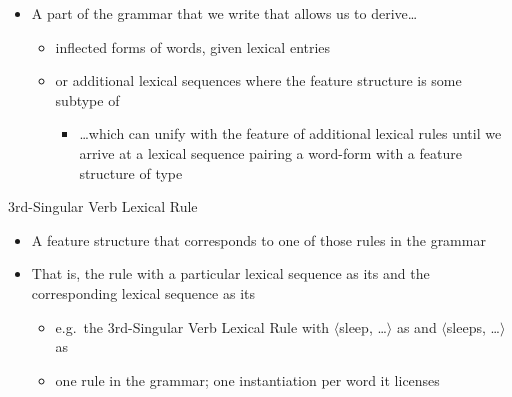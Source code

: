 \documentclass[a4paper,landscape,headrule,footrule]{foils}
\begin{document}

\begin{itemize}
\item A part of the grammar that we write that allows us to derive\ldots
  \begin{itemize}
  \item inflected forms of words, given lexical entries
  \item or additional lexical sequences where the feature structure is
    some subtype of 
    \begin{itemize}
    \item \ldots which can unify with the  feature of
      additional lexical rules until we arrive at a lexical sequence
      pairing a word-form with a feature structure of type 
    \end{itemize}
  \end{itemize}
\end{itemize}

\begin{center}
3rd-Singular Verb Lexical Rule

\medskip
{}
\end{center}

\begin{itemize}
\item A  feature structure that corresponds to
  one of those rules in the grammar
\item That is, the rule with a particular lexical sequence as its
   and the corresponding lexical sequence as its 
  \begin{itemize}
  \item e.g.\ the 3rd-Singular Verb Lexical Rule with
    $\langle$\textnormal{sleep}, \ldots$\rangle$ as  and
    $\langle$\textnormal{sleeps}, \ldots$\rangle$ as 
  \item one rule in the grammar; one instantiation per word it licenses
  \end{itemize}
\end{itemize}
\end{document}
